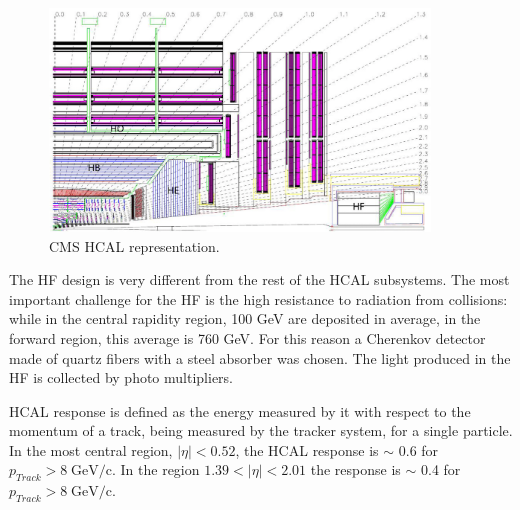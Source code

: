 \begin{figure}[!Hhtbp]
  \begin{center}
    \includegraphics[width=0.9\textwidth]{figs/HCAL.png}
    \caption{CMS HCAL representation. }
    \label{fig:hcal}
  \end{center}
\end{figure}

The HF design is very different from the rest of the HCAL subsystems. The most important challenge for the HF is the high resistance to radiation from collisions: while in the central rapidity region, 100 GeV are deposited in average, in the forward region, this average is 760 GeV. For this reason a Cherenkov detector made of quartz fibers with a steel absorber was chosen. The light produced in the HF is collected by photo multipliers. 

HCAL response is defined as the energy measured by it with respect to the momentum of a track, being measured by the tracker system, for a single particle. In the most central region, $|\eta|<0.52$, the HCAL response is $\sim$ 0.6 for ${p_{Track}>8\;\text{GeV/c}}$. In the region $1.39<|\eta|<2.01$ the response is $\sim$ 0.4 for ${p_{Track}>8\;\text{GeV/c}}$.

%

